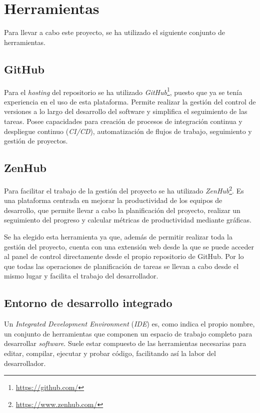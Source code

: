 \section{Herramientas}

Para llevar a cabo este proyecto, se ha utilizado el siguiente conjunto de herramientas.

\subsection{GitHub}

Para el \textit{hosting} del repositorio se ha utilizado \textit{GitHub}\footnote{\url{https://github.com/}}, puesto que ya se tenía experiencia en el uso de esta plataforma. Permite realizar la gestión del control de versiones a lo largo del desarrollo del software y simplifica el seguimiento de las tareas. Posee capacidades para creación de procesos de integración continua y despliegue continuo (\textit{CI/CD}), automatización de flujos de trabajo, seguimiento y gestión de proyectos.

\subsection{ZenHub}
Para facilitar el trabajo de la gestión del proyecto se ha utilizado \textit{ZenHub}\footnote{\url{https://www.zenhub.com/}}. Es una plataforma centrada en mejorar la productividad de los equipos de desarrollo, que permite llevar a cabo la planificación del proyecto, realizar un seguimiento del progreso y calcular métricas de productividad mediante gráficas. 

Se ha elegido esta herramienta ya que, además de permitir realizar toda la gestión del proyecto, cuenta con una extensión web desde la que se puede acceder al panel de control directamente desde el propio repositorio de GitHub. Por lo que todas las operaciones de planificación de tareas se llevan a cabo desde el mismo lugar y facilita el trabajo del desarrollador.

\subsection{Entorno de desarrollo integrado}

Un \textit{Integrated Development Environment} (\textit{IDE}) es, como indica el propio nombre, un conjunto de herramientas que componen un espacio de trabajo completo para desarrollar \textit{software}. Suele estar compuesto de las herramientas necesarias para editar, compilar, ejecutar y probar código, facilitando así la labor del desarrollador.

